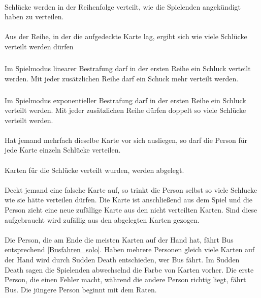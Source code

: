\paragraph{}
Schlücke werden in der Reihenfolge verteilt, wie die Spielenden angekündigt haben zu verteilen.

\paragraph{} \label{Busfahren_group:Spielablauf:Bestrafung}
Aus der Reihe, in der die aufgedeckte Karte lag, ergibt sich wie viele Schlücke verteilt werden dürfen
\subparagraph{} \label{Busfahren_group:Spielablauf:Bestrafung:linear}
Im Spielmodus linearer Bestrafung darf in der ersten Reihe ein Schluck verteilt werden.
Mit jeder zusätzlichen Reihe darf ein Schuck mehr verteilt werden.

\subparagraph{} \label{Busfahren_group:Spielablauf:Bestrafung:exponentiell}
Im Spielmodus exponentieller Bestrafung darf in der ersten Reihe ein Schluck verteilt werden.
Mit jeder zusätzlichen Reihe dürfen doppelt so viele Schlücke verteilt werden.

\paragraph{}
Hat jemand mehrfach dieselbe Karte vor sich ausliegen, so darf die Person für jede Karte einzeln Schlücke verteilen.

\paragraph{}
Karten für die Schlücke verteilt wurden, werden abgelegt.

\paragraph{} \label{Busfahren_group:Spielablauf:Ziehen}
Deckt jemand eine falsche Karte auf, so trinkt die Person selbst so viele Schlucke wie sie hätte verteilen dürfen.
Die Karte ist anschließend aus dem Spiel und die Person zieht eine neue zufällige Karte aus den nicht verteilten Karten.
Sind diese aufgebraucht wird zufällig aus den abgelegten Karten gezogen.

\paragraph{}
Die Person, die am Ende die meisten Karten auf der Hand hat, fährt Bus entsprechend \ref{Busfahren_solo}.
Haben mehrere Personen gleich viele Karten auf der Hand wird durch Sudden Death entschieden, wer Bus fährt.
Im Sudden Death sagen die Spielenden abwechselnd die Farbe von Karten vorher.
Die erste Person, die einen Fehler macht, während die andere Person richtig liegt, fährt Bus.
Die jüngere Person beginnt mit dem Raten.


